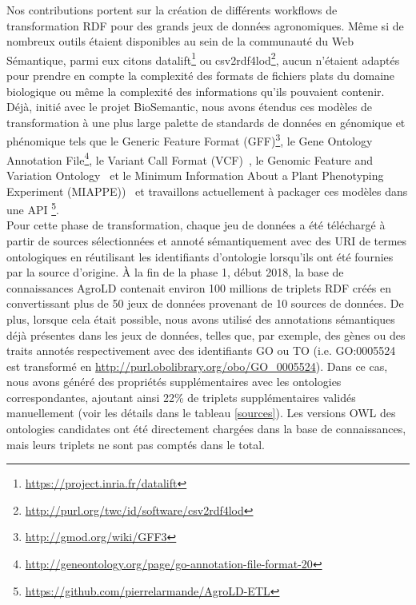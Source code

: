 Nos contributions portent sur la création de différents workflows de transformation RDF pour des grands jeux de données agronomiques. Même si de nombreux outils étaient disponibles au sein de la communauté du Web Sémantique, parmi eux citons datalift\footnote{\url{https://project.inria.fr/datalift}} ou csv2rdf4lod\footnote{\url{http://purl.org/twc/id/software/csv2rdf4lod}}, aucun n'étaient adaptés pour prendre en compte la complexité des formats de fichiers plats du domaine biologique ou même la complexité des informations qu'ils pouvaient contenir. Déjà, initié avec le projet BioSemantic, nous avons étendus ces modèles de transformation à une plus large palette de standards de données en génomique et phénomique tels que le Generic Feature Format (GFF)\footnote{\url{http://gmod.org/wiki/GFF3}}, le Gene Ontology Annotation File\footnote{\url{http://geneontology.org/page/go-annotation-file-format-20}}, le Variant Call Format (VCF)~\cite{danecek2011}, le Genomic Feature and Variation Ontology~\cite{gfvo2015} et le Minimum Information About a Plant Phenotyping Experiment (MIAPPE))~\cite{miappe} et travaillons actuellement à packager ces modèles dans une API \footnote{\url{https://github.com/pierrelarmande/AgroLD-ETL}}. \\

Pour cette phase de transformation, chaque jeu de données a été téléchargé à partir de sources sélectionnées et annoté sémantiquement avec des URI de termes ontologiques en réutilisant les identifiants d’ontologie lorsqu’ils ont été fournies par la source d’origine.  À la fin de la phase 1, début 2018, la base de connaissances AgroLD contenait environ 100 millions de triplets RDF créés en convertissant plus de 50 jeux de données provenant de 10 sources de données. De plus, lorsque cela était possible, nous avons utilisé des annotations sémantiques déjà présentes dans les jeux de données, telles que, par exemple, des gènes ou des traits annotés respectivement avec des identifiants GO ou TO (i.e. GO:0005524 est transformé en \url{http://purl.obolibrary.org/obo/GO\_0005524}). Dans ce cas, nous avons généré des propriétés supplémentaires avec les ontologies correspondantes, ajoutant ainsi 22\% de triplets supplémentaires validés manuellement (voir les détails dans le tableau \ref{sources}). Les versions OWL des ontologies candidates ont été directement chargées dans la base de connaissances, mais leurs triplets ne sont pas comptés dans le total.\\


